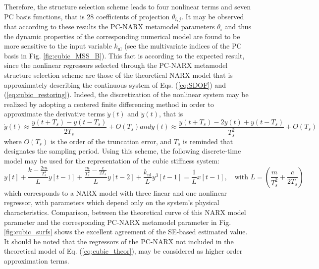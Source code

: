\documentclass[preprint,3p,review,times,11pt]{elsarticle}
\newcommand{\beq}{\begin{equation}}
\newcommand{\eeq}{\end{equation}}
\begin{document}
Therefore, the structure selection scheme leads to four nonlinear terms and seven PC basis functions, that is 28 coefficients of projection $\theta_{i,j}$. It may be observed that according to these results the PC-NARX metamodel parameters $\theta_i$ and thus the dynamic properties of the corresponding numerical model are found to be more sensitive to the input variable $k_{\mathrm{nl}}$ (see the multivariate indices of the PC basis in Fig. \ref{fig:cubic_MSS_B}). This fact is according to the expected result, since the nonlinear regressors selected through the PC-NARX metamodel structure selection scheme are those of the theoretical NARX model that is approximately describing the continuous system of Eqs. (\ref{eq:SDOF}) and (\ref{eq:cubic_restoring}). Indeed, the discretization of the nonlinear system may be realized by adopting a centered finite differencing method in order to approximate the derivative terms $\dot{y}(t)$ and $\ddot{y}(t)$, that is 
%
\begin{subequations}
%
\beq \dot{y}(t) \approx \frac{y(t+T_s) - y(t-T_s)}{2T_s} + O(T_s)\eeq
%
and
%
\beq \ddot{y}(t) \approx \frac{y(t+T_s) - 2y(t) + y(t-T_s)}{T_s^2} + O(T_s)\eeq
%
\end{subequations}
%
where $O(T_s)$ is the order of the truncation error, and $T_s$ is reminded that designates the sampling period. Using this scheme, the following discrete-time model may be used for the representation of the cubic stiffness system:   
%
\beq y[t] + \frac{k-\frac{2m}{T_s^2}}{L}y[t-1] + \frac{\frac{m}{T_s^2}-\frac{c}{2T_s}}{L}y[t-2] + \frac{k_{\mathrm{nl}}}{L}y^3[t-1] = \frac{1}{L}x[t-1], \quad \text{with } L = \left(\frac{m}{T_s^2}+\frac{c}{2T_s}\right) \label{eq:cubic_theor}\eeq
%
which corresponds to a NARX model with three linear and one nonlinear regressor, with parameters which depend only on the system's physical characteristics. Comparison, between the theoretical curve of this NARX model parameter and the corresponding PC-NARX metamodel parameter in Fig. \ref{fig:cubic_surfs} shows the excellent agreement of the SE-based estimated value. It should be noted that the regressors of the PC-NARX not included in the theoretical model of Eq. (\ref{eq:cubic_theor}), may be considered as higher order approximation terms.
\end{document}
